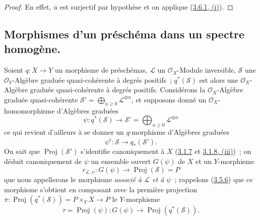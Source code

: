 \begin{proof}
En effet, $\overline{u}$ est surjectif par hypothèse et on applique
(\hyperref[II.3.6.1-fr]{3.6.1, (i)}).
\end{proof}

\subsection{Morphismes d'un préschéma dans un spectre homogène.}
\label{subsection:II.3.7-fr}

\begin{env}[3.7.1]
\label{II.3.7.1-fr}
Soient $q:X\to Y$ un morphisme de préschémas, $\mathcal{L}$ un
$\mathcal{O}_X$-Module inversible, $\mathcal{S}$ une $\mathcal{O}_Y$-Algèbre
graduée quasi-cohérente à degrés positifs~; $q^*(\mathcal{S})$ est alors une
$\mathcal{O}_X$-Algèbre graduée quasi-cohérente à degrés positifs.
Considérons la $\mathcal{O}_X$-Algèbre graduée quasi-cohérente
$\mathcal{S}'=\bigoplus_{n\geq0}\mathcal{L}^{\otimes n}$, et supposons donné
un $\mathcal{O}_X$-homomorphisme d'Algèbres graduées
\[
  \psi:q^*(\mathcal{S})\longrightarrow
  \mathcal{S}'=\bigoplus_{n\geq0}\mathcal{L}^{\otimes n}
\]
ce qui revient d'ailleurs à se donner un $q$-morphisme d'Algèbres graduées
\[
  \psi^\flat:\mathcal{S}\longrightarrow q_*(\mathcal{S}').
\]
On sait que $\operatorname{Proj}(\mathcal{S}')$ s'identifie canoniquement à
$X$ (\hyperref[II.3.1.7-fr]{3.1.7} et
\hyperref[II.3.1.8-fr]{3.1.8, (iii)})~; on déduit canoniquement de $\psi$ un
ensemble ouvert $G(\psi)$ de $X$ et un $Y$-morphisme
\[
\label{II.3.7.1.1-fr}
  r_{\mathcal{L},\psi}:G(\psi)\longrightarrow
  \operatorname{Proj}(\mathcal{S})=P
\tag{3.7.1.1}
\]
que nous appellerons le morphisme \emph{associé à $\mathcal{L}$ et à $\psi$}~;
rappelons (\hyperref[II.3.5.6-fr]{3.5.6}) que ce morphisme s'obtient en
composant avec la première projection
$\pi:\operatorname{Proj}(q^*(\mathcal{S}))=P\times_YX\to P$ le
$Y$-morphisme
\[
  \tau=\operatorname{Proj}(\psi):G(\psi)\longrightarrow
  \operatorname{Proj}(q^*(\mathcal{S})).
\]
\end{env}

